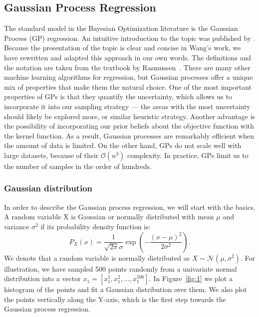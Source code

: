 

\newpage
\subsection{Gaussian Process Regression}
The standard model in the Bayesian Optimization literature is the Gaussian Process (GP) regression. An intuitive introduction to the topic was published by \citet{wang2023intuitive}. Because the presentation of the topic is clear and concise in Wang's work, we have rewritten and adapted this approach in our own words. The definitions and the notation are taken from the textbook by Rasmussen~\cite{rasmussen2006gaussian}. There are many other machine learning algorithms for regression, but Gaussian processes offer a unique mix of properties that make them the natural choice. One of the most important properties of GPs is that they quantify the uncertainty, which allows us to incorporate it into our sampling strategy --- the areas with the most uncertainty should likely be explored more, or similar heuristic strategy. Another advantage is the possibility of incorporating our prior beliefs about the objective function with the kernel function. As a result, Gaussian processes are remarkably efficient when the amount of data is limited. On the other hand, GPs do not scale well with large datasets, because of their $\mathcal{O}(n^3)$ complexity. In practice, GPs limit us to the number of samples in the order of hundreds.

\subsubsection{Gaussian distribution}
In order to describe the Gaussian process regression, we will start with the basics. A random variable X is Gaussian or normally distributed with mean $\mu$ and variance $\sigma^2$ if its probability density function is: \[ P_X(x) = \frac{1}{\sqrt{2\pi} \sigma} \exp\left(-\frac{(x-\mu)^2}{2 \sigma^2}\right). \] We denote that a random variable is normally distributed as $X \sim \mathcal{N}(\mu, \sigma^2)$. For illustration, we have sampled 500 points randomly from a univariate normal distribution into a vector $x_1 =[x_1^1,x_1^2, \ldots,x_1^{500}]$. In Figure~\ref{fig:1} we plot a histogram of the points and fit a Gaussian distribution over them. We also plot the points vertically along the Y-axis, which is the first step towards the Gaussian process regression.


